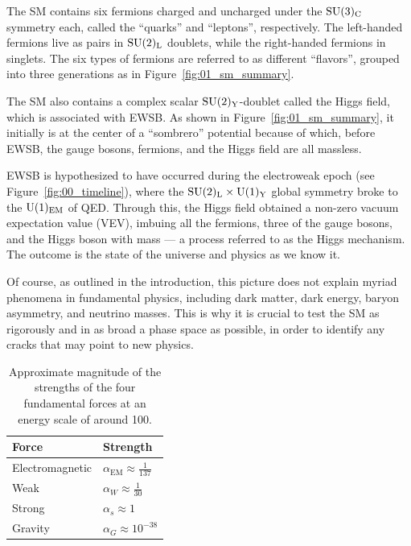 The SM contains six fermions charged and uncharged under the $\SU[3]_{\mathrm{C}}$ symmetry each, called the ``quarks'' and ``leptons'', respectively.
The left-handed fermions live as pairs in $\SU[2]_{\mathrm{L}}$ doublets, while the right-handed fermions in singlets.
The six types of fermions are referred to as different ``flavors'', grouped into three generations as in Figure~\ref{fig:01_sm_summary}.

The SM also contains a complex scalar $\SU[2]_{\mathrm{Y}}$-doublet called the Higgs field, which is associated with EWSB.
As shown in Figure~\ref{fig:01_sm_summary}, it initially is at the center of a ``sombrero'' potential because of which, before EWSB, the gauge bosons, fermions, and the Higgs field are all massless.

EWSB is hypothesized to have occurred during the electroweak epoch (see Figure~\ref{fig:00_timeline}), where the $\SU[2]_{\mathrm{L}} \times \UU[1]_{\mathrm{Y}}$ global symmetry broke to the $\UU[1]_{\mathrm{EM}}$ of QED.
Through this, the Higgs field obtained a non-zero vacuum expectation value (VEV), imbuing all the fermions, three of the gauge bosons, and the Higgs boson with mass --- a process referred to as the Higgs mechanism.
The outcome is the state of the universe and physics as we know it.

Of course, as outlined in the introduction, this picture does not explain myriad phenomena in fundamental physics, including dark matter, dark energy, baryon asymmetry, and neutrino masses.
This is why it is crucial to test the SM as rigorously and in as broad a phase space as possible, in order to identify any cracks that may point to new physics.


\begin{table}[htbp]
    \centering
	\caption{Approximate magnitude of the strengths of the four fundamental forces at an energy scale of around 100\MeV.}
	\renewcommand{\arraystretch}{1.5}
    \begin{tabular}{ll}
        \toprule
        \textbf{Force} & \textbf{Strength}\\
        \midrule
        Electromagnetic &
        $\alpha_{\mathrm{EM}} \approx \frac{1}{137}$ \\
        Weak &
        $\alpha_W \approx \frac{1}{30}$\\
        Strong &
        $\alpha_s \approx 1$\\
        Gravity &
        $\alpha_G  \approx 10^{-38}$\\
        \bottomrule
    \end{tabular}
	\label{tab:01_sm_coupling_constants}
\end{table}

